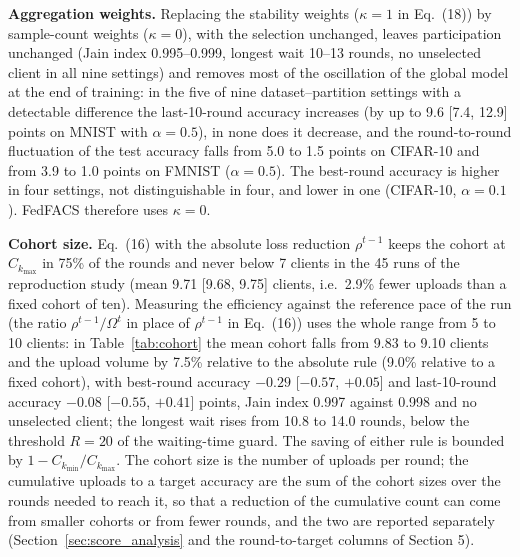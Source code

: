 \documentclass[pdflatex,sn-mathphys-num,oneside]{sn-jnl}%
\theoremstyle{thmstyleone}%
\theoremstyle{thmstyletwo}%
\theoremstyle{thmstylethree}%
\begin{document}
\textbf{Aggregation weights.} Replacing the stability weights ($\kappa=1$ in Eq.~(18)) by sample-count weights ($\kappa=0$), with the selection unchanged, leaves participation unchanged (Jain index 0.995--0.999, longest wait 10--13 rounds, no unselected client in all nine settings) and removes most of the oscillation of the global model at the end of training: in the five of nine dataset--partition settings with a detectable difference the last-10-round accuracy increases (by up to 9.6 [7.4, 12.9] points on MNIST with $\alpha=0.5$), in none does it decrease, and the round-to-round fluctuation of the test accuracy falls from 5.0 to 1.5 points on CIFAR-10 and from 3.9 to 1.0 points on FMNIST ($\alpha=0.5$). The best-round accuracy is higher in four settings, not distinguishable in four, and lower in one (CIFAR-10, $\alpha=0.1$). FedFACS therefore uses $\kappa=0$.

\textbf{Cohort size.} Eq.~(16) with the absolute loss reduction $\rho^{t-1}$ keeps the cohort at $C_{k_{\max}}$ in 75\% of the rounds and never below 7 clients in the 45 runs of the reproduction study (mean 9.71 [9.68, 9.75] clients, i.e.\ 2.9\% fewer uploads than a fixed cohort of ten). Measuring the efficiency against the reference pace of the run (the ratio $\rho^{t-1}/\Omega^{t}$ in place of $\rho^{t-1}$ in Eq.~(16)) uses the whole range from 5 to 10 clients: in Table~\ref{tab:cohort} the mean cohort falls from 9.83 to 9.10 clients and the upload volume by 7.5\% relative to the absolute rule (9.0\% relative to a fixed cohort), with best-round accuracy $-0.29$ [$-0.57$, $+0.05$] and last-10-round accuracy $-0.08$ [$-0.55$, $+0.41$] points, Jain index 0.997 against 0.998 and no unselected client; the longest wait rises from 10.8 to 14.0 rounds, below the threshold $R=20$ of the waiting-time guard. The saving of either rule is bounded by $1-C_{k_{\min}}/C_{k_{\max}}$. The cohort size is the number of uploads per round; the cumulative uploads to a target accuracy are the sum of the cohort sizes over the rounds needed to reach it, so that a reduction of the cumulative count can come from smaller cohorts or from fewer rounds, and the two are reported separately (Section~\ref{sec:score_analysis} and the round-to-target columns of Section 5).
\end{document}
